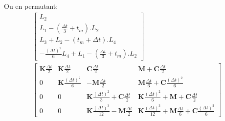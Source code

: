 \documentclass[12pt,a4paper]{report}
\begin{document}
Ou en permutant:
\begin{equation}
\begin{array}{c}
	\begin{bmatrix}	
		  L_2
		\\ L_1 - \left( \frac{\Delta t}{3} + t_m \right).L_2
		\\ L_3 + L_2 - (t_m+\Delta t).L_4
		\\ -\frac{(\Delta t)^2}{6} L_4 
			+ L_1 
			- \left( \frac{\Delta t}{3} + t_m \right).L_2
	\end{bmatrix}
	\\
		\begin{bmatrix}   
		   		\mathbf{K} \frac{\Delta t}{2}
			&
		   		\mathbf{K} \frac{\Delta t}{2} 
		   	&
		   		\mathbf{C} \frac{\Delta t}{2}
			&
			   \mathbf{M} 
			   +\mathbf{C} \frac{\Delta t}{2}
		\\ 	     
			   0 
			&
			   \mathbf{K} \frac{(\Delta t)^2}{6}
		   	&   
			   -\mathbf{M}
			   		\frac{\Delta t}{2}   
			&
			   \mathbf{M}	\frac{ \Delta t}{6} 
			   +\mathbf{C} \frac{(\Delta t)^2}{6} 
		\\   
		   		0
		   	& 
		   		0
		   	&
			   	\mathbf{K}
			   		\frac{(\Delta t)^2}{3} 
		   		+\mathbf{C} \frac{\Delta t}{2}
		   	&
		   		\mathbf{K} \frac{(\Delta t)^2}{6} 
		   		+\mathbf{M} 
			   	+\mathbf{C} \frac{\Delta t}{2}
		\\    
		   		0
		   	&
		   		0
		   	&
		   		\mathbf{K} \frac{(\Delta t)^3}{12}
		   		-\mathbf{M}
			   		\frac{\Delta t}{2} 
		   	&
		   		\mathbf{K} \frac{(\Delta t)^3}{12}
		   		+\mathbf{M} \frac{\Delta t}{6} 
			   +\mathbf{C} \frac{(\Delta t)^2}{6} 
	\end{bmatrix}
\end{array}
\end{equation}
\end{document}
